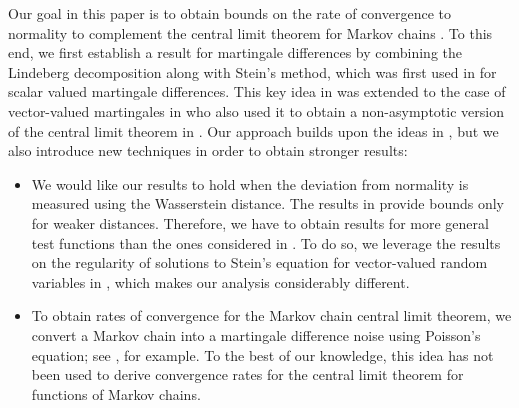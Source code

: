 \documentclass[11pt]{article}
\begin{document}
Our goal in this paper is to obtain bounds on the rate of convergence to normality to complement the central limit theorem for Markov chains \citep{meyn2012markov}. To this end, we first establish a result for martingale differences by combining the Lindeberg decomposition along with Stein's method, which was first used in \citep{rollin2018quantitative} for scalar valued martingale differences. This key idea in \citep{rollin2018quantitative} was extended to the case of vector-valued martingales in \citep{anastasiou2019normal} who also used it to obtain a non-asymptotic version of the central limit theorem in \citep{polyak1992acceleration}. Our approach builds upon the ideas in \citep{rollin2018quantitative,anastasiou2019normal}, but we also introduce new techniques in order to obtain stronger results:
\begin{itemize}
    \item We would like our results to hold when the deviation from normality is measured using the Wasserstein distance. The results in \citep{anastasiou2019normal} provide bounds only for weaker distances. Therefore, we have to obtain results for more general test functions than the ones considered in \citep{anastasiou2019normal}. To do so, we leverage the results on the regularity of solutions to Stein's equation for vector-valued random variables in \citep{gallouet2018regularity,fang2019multivariate}, which makes our analysis considerably different. 
    \item To obtain rates of convergence for the Markov chain central limit theorem, we convert a Markov chain into a martingale difference noise using Poisson's equation; see \citep{metivier1984applications,benveniste2012adaptive,douc2018markov}, for example. To the best of our knowledge, this idea has not been used to derive convergence rates for the central limit theorem for functions of Markov chains. 
\end{itemize}
\end{document}
